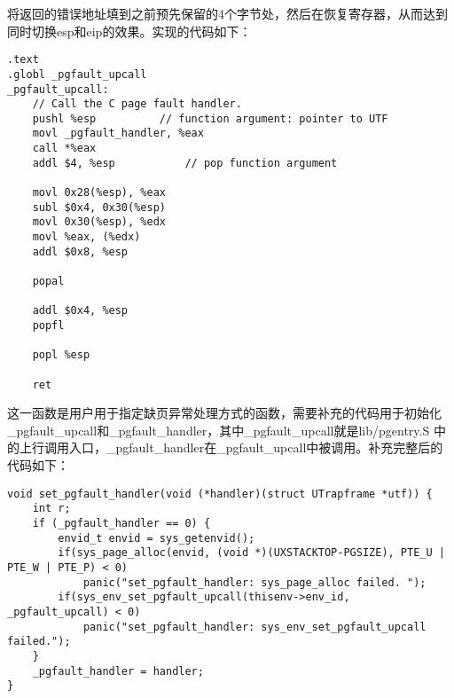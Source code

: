 \begin{exerciseSolution}{10}
    \par 将返回的错误地址填到之前预先保留的4个字节处，然后在恢复寄存器，从而达到同时切换esp和eip的效果。实现的代码如下：
    \begin{lstlisting}
.text
.globl _pgfault_upcall
_pgfault_upcall:
	// Call the C page fault handler.
	pushl %esp			// function argument: pointer to UTF
	movl _pgfault_handler, %eax
	call *%eax
	addl $4, %esp			// pop function argument

    movl 0x28(%esp), %eax
    subl $0x4, 0x30(%esp)
    movl 0x30(%esp), %edx
    movl %eax, (%edx)
    addl $0x8, %esp

    popal

    addl $0x4, %esp
    popfl

    popl %esp

    ret
    \end{lstlisting}
\end{exerciseSolution}

\begin{exerciseSolution}{11}
    \par 这一函数是用户用于指定缺页异常处理方式的函数，需要补充的代码用于初始化\_pgfault\_upcall和\_pgfault\_handler，其中\_pgfault\_upcall就是lib/pgentry.S 中的上行调用入口，\_pgfault\_handler在\_pgfault\_upcall中被调用。补充完整后的代码如下：
    \begin{lstlisting}
void set_pgfault_handler(void (*handler)(struct UTrapframe *utf)) {
	int r;
	if (_pgfault_handler == 0) {
        envid_t envid = sys_getenvid();
        if(sys_page_alloc(envid, (void *)(UXSTACKTOP-PGSIZE), PTE_U | PTE_W | PTE_P) < 0)
            panic("set_pgfault_handler: sys_page_alloc failed. ");
        if(sys_env_set_pgfault_upcall(thisenv->env_id, _pgfault_upcall) < 0)
            panic("set_pgfault_handler: sys_env_set_pgfault_upcall failed.");
	}
	_pgfault_handler = handler;
}
    \end{lstlisting}
\end{exerciseSolution}

